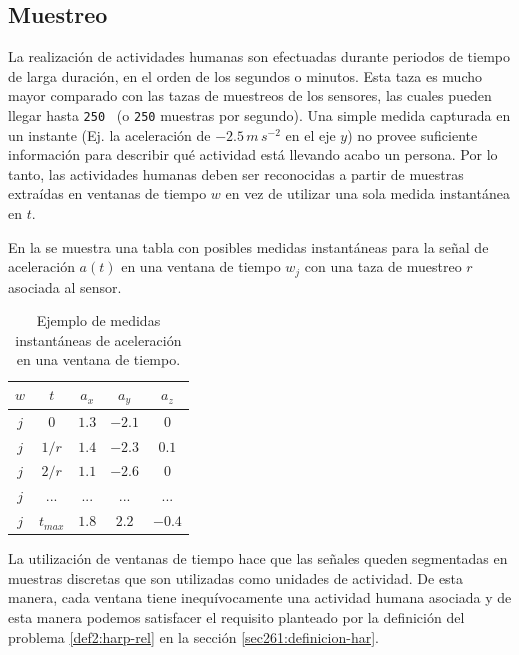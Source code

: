 \subsection{Muestreo}

\label{ssec44:sampling}La realización de actividades humanas son
efectuadas durante periodos de tiempo de larga duración, en el orden
de los segundos o minutos. Esta taza es mucho mayor comparado con
las tazas de muestreos de los sensores, las cuales pueden llegar hasta
\texttt{250 } (o \texttt{250} muestras por segundo). Una
simple medida capturada en un instante (Ej. la aceleración de $-2.5\,m\,s^{-2}$
en el eje $y$) no provee suficiente información para describir qué
actividad está llevando acabo un persona. Por lo tanto, las actividades
humanas deben ser reconocidas a partir de muestras extraídas en ventanas
de tiempo $w$ en vez de utilizar una sola medida instantánea en $t$. 

En la  se muestra una tabla con posibles medidas
instantáneas para la señal de aceleración $a(t)$ en una ventana de
tiempo $w_{j}$ con una taza de muestreo $r$asociada al sensor.

\begin{table}[!tbph]
\begin{centering}
\begin{tabular}{|c|c|c|c|c|}
\hline 
$w$ & $t$ & $a_{x}$ & $a_{y}$ & $a_{z}$\tabularnewline
\hline 
\hline 
$j$ & $0$ & \texttt{$1.3$} & \texttt{$-2.1$} & \texttt{$0$}\tabularnewline
\hline 
$j$ & $1/r$ & \texttt{$1.4$} & \texttt{$-2.3$} & \texttt{$0.1$}\tabularnewline
\hline 
$j$ & $2/r$ & \texttt{$1.1$} & \texttt{$-2.6$} & \texttt{$0$}\tabularnewline
\hline 
$j$ & ... & \texttt{$...$} & \texttt{$...$} & \texttt{$...$}\tabularnewline
\hline 
$j$ & $t_{max}$ & \texttt{$1.8$} & \texttt{$2.2$} & \texttt{$-0.4$}\tabularnewline
\hline 
\end{tabular}
\par\end{centering}
\caption[Medidas instantáneas de aceleración ]{\label{tab4:ex-signal}Ejemplo de medidas instantáneas de aceleración
en una ventana de tiempo.}
\end{table}

La utilización de ventanas de tiempo hace que las señales queden segmentadas
en muestras discretas que son utilizadas como unidades de actividad.
De esta manera, cada ventana tiene inequívocamente una actividad humana
asociada y de esta manera podemos satisfacer el requisito planteado
por la definición del problema \ref{def2:harp-rel} en la sección
\ref{sec261:definicion-har}. 

